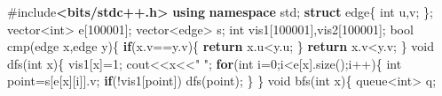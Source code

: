 \documentclass[
]{article}
\newenvironment{Shaded}{}{}
\newcommand{\ControlFlowTok}[1]{\textcolor[rgb]{0.00,0.44,0.13}{\textbf{#1}}}
\newcommand{\DataTypeTok}[1]{\textcolor[rgb]{0.56,0.13,0.00}{#1}}
\newcommand{\DecValTok}[1]{\textcolor[rgb]{0.25,0.63,0.44}{#1}}
\newcommand{\ImportTok}[1]{\textcolor[rgb]{0.00,0.50,0.00}{\textbf{#1}}}
\newcommand{\KeywordTok}[1]{\textcolor[rgb]{0.00,0.44,0.13}{\textbf{#1}}}
\newcommand{\NormalTok}[1]{#1}
\newcommand{\OperatorTok}[1]{\textcolor[rgb]{0.40,0.40,0.40}{#1}}
\newcommand{\PreprocessorTok}[1]{\textcolor[rgb]{0.74,0.48,0.00}{#1}}
\newcommand{\StringTok}[1]{\textcolor[rgb]{0.25,0.44,0.63}{#1}}
\begin{document}
\begin{Shaded}
\begin{Highlighting}[]
\PreprocessorTok{\#include}\ImportTok{\textless{}bits/stdc++.h\textgreater{}}
\KeywordTok{using} \KeywordTok{namespace}\NormalTok{ std}\OperatorTok{;}
\KeywordTok{struct}\NormalTok{ edge}\OperatorTok{\{}
	\DataTypeTok{int}\NormalTok{ u}\OperatorTok{,}\NormalTok{v}\OperatorTok{;}
\OperatorTok{\};}
\NormalTok{vector}\OperatorTok{\textless{}}\DataTypeTok{int}\OperatorTok{\textgreater{}}\NormalTok{ e}\OperatorTok{[}\DecValTok{100001}\OperatorTok{];}
\NormalTok{vector}\OperatorTok{\textless{}}\NormalTok{edge}\OperatorTok{\textgreater{}}\NormalTok{ s}\OperatorTok{;}
\DataTypeTok{int}\NormalTok{ vis1}\OperatorTok{[}\DecValTok{100001}\OperatorTok{],}\NormalTok{vis2}\OperatorTok{[}\DecValTok{100001}\OperatorTok{];}
\DataTypeTok{bool}\NormalTok{ cmp}\OperatorTok{(}\NormalTok{edge x}\OperatorTok{,}\NormalTok{edge y}\OperatorTok{)\{}
	\ControlFlowTok{if}\OperatorTok{(}\NormalTok{x}\OperatorTok{.}\NormalTok{v}\OperatorTok{==}\NormalTok{y}\OperatorTok{.}\NormalTok{v}\OperatorTok{)\{}
		\ControlFlowTok{return}\NormalTok{ x}\OperatorTok{.}\NormalTok{u}\OperatorTok{\textless{}}\NormalTok{y}\OperatorTok{.}\NormalTok{u}\OperatorTok{;}
	\OperatorTok{\}}
	\ControlFlowTok{return}\NormalTok{ x}\OperatorTok{.}\NormalTok{v}\OperatorTok{\textless{}}\NormalTok{y}\OperatorTok{.}\NormalTok{v}\OperatorTok{;}
\OperatorTok{\}}
\DataTypeTok{void}\NormalTok{ dfs}\OperatorTok{(}\DataTypeTok{int}\NormalTok{ x}\OperatorTok{)\{}
\NormalTok{	vis1}\OperatorTok{[}\NormalTok{x}\OperatorTok{]=}\DecValTok{1}\OperatorTok{;}
\NormalTok{	cout}\OperatorTok{\textless{}\textless{}}\NormalTok{x}\OperatorTok{\textless{}\textless{}}\StringTok{" "}\OperatorTok{;}
	\ControlFlowTok{for}\OperatorTok{(}\DataTypeTok{int}\NormalTok{ i}\OperatorTok{=}\DecValTok{0}\OperatorTok{;}\NormalTok{i}\OperatorTok{\textless{}}\NormalTok{e}\OperatorTok{[}\NormalTok{x}\OperatorTok{].}\NormalTok{size}\OperatorTok{();}\NormalTok{i}\OperatorTok{++)\{}
		\DataTypeTok{int}\NormalTok{ point}\OperatorTok{=}\NormalTok{s}\OperatorTok{[}\NormalTok{e}\OperatorTok{[}\NormalTok{x}\OperatorTok{][}\NormalTok{i}\OperatorTok{]].}\NormalTok{v}\OperatorTok{;}
		\ControlFlowTok{if}\OperatorTok{(!}\NormalTok{vis1}\OperatorTok{[}\NormalTok{point}\OperatorTok{])}\NormalTok{ dfs}\OperatorTok{(}\NormalTok{point}\OperatorTok{);}
	\OperatorTok{\}}
\OperatorTok{\}}
\DataTypeTok{void}\NormalTok{ bfs}\OperatorTok{(}\DataTypeTok{int}\NormalTok{ x}\OperatorTok{)\{}
\NormalTok{	queue}\OperatorTok{\textless{}}\DataTypeTok{int}\OperatorTok{\textgreater{}}\NormalTok{ q}\OperatorTok{;}

\end{Highlighting}
\end{Shaded}
\end{document}
